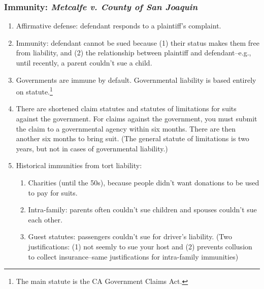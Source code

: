 %
%
%
%
%

\subsubsection{Immunity: \emph{Metcalfe v. County of San Joaquin}}

\begin{enumerate}
    \item Affirmative defense: defendant responds to a plaintiff's complaint.
    \item Immunity: defendant cannot be sued because (1) their status makes them free from liability, and (2) the relationship between plaintiff and defendant--e.g., until recently, a parent couldn't sue a child.
    \item Governments are immune by default. Governmental liability is based entirely on statute.\footnote{The main statute is the CA Government Claims Act.}
    \item There are shortened claim statutes and statutes of limitations for suits against the government. For claims against the government, you must submit the claim to a governmental agency within six months. There are then another six months to bring suit. (The general statute of limitations is two years, but not in cases of governmental liability.)
    \item Historical immunities from tort liability:
    \begin{enumerate}
        \item Charities (until the 50s), because people didn't want donations to be used to pay for suits.
        \item Intra-family: parents often couldn't sue children and spouses couldn't sue each other.
        \item Guest statutes: passengers couldn't sue for driver's liability. (Two justifications: (1) not seemly to sue your host and (2) prevents collusion to collect insurance--same justifications for intra-family immunities)
    \end{enumerate}
\end{enumerate}

